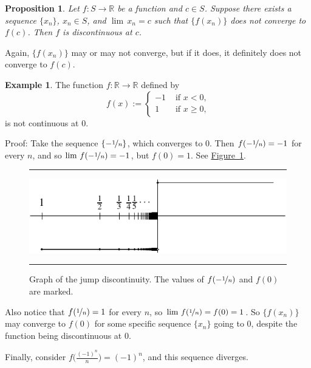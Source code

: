 \documentclass[12pt]{book}
\newenvironment{myfigureht}{%
\begin{figure}[h!t]
\noindent\rule{\textwidth}{0.4pt}\vspace{12pt}\par\centering}%
{\par\noindent\rule{\textwidth}{0.4pt}
\end{figure}}
\newcommand{\R}{{\mathbb{R}}}
\theoremstyle{plain}
\newtheorem{prop}[thm]{Proposition}
\theoremstyle{remark}
\theoremstyle{definition}
\theoremstyle{exercise}
\theoremstyle{example}
\newtheorem{example}[thm]{Example}
\newcommand{\figureref}[1]{\hyperref[#1]{Figure~\ref*{#1}}}
\begin{document}
\begin{prop}
Let $f \colon S \to \R$ be a function and $c \in S$.  Suppose 
there exists a sequence $\{ x_n \}$, $x_n \in S$, and $\lim\, x_n = c$
such that $\{ f(x_n) \}$ does not converge to $f(c)$.  Then $f$ is 
discontinuous at $c$.
\end{prop}

Again, 
$\{ f(x_n) \}$ may or may not converge, but
if it does, it definitely does not converge to
$f(c)$.

\begin{example} \label{example:jumpdiscont}
The function $f \colon \R \to \R$ defined by
\begin{equation*}
f(x) := 
\begin{cases}
-1 & \text{ if $x < 0$,} \\
1 & \text{ if $x \geq 0$,}
\end{cases}
\end{equation*}
is not continuous at 0.

Proof: Take the sequence $\{ - \nicefrac{1}{n} \}$, which converges to 0.  Then
$f(-\nicefrac{1}{n}) = -1$ for every $n$,
and so
$\lim\, f(-\nicefrac{1}{n}) = -1$, but $f(0) = 1$.  See
\figureref{fig:jumpdiscont}.

\begin{myfigureht}
\includegraphics{figures/jumpdiscont}
\caption{Graph of the jump discontinuity.  The values of
$f(-\nicefrac{1}{n})$ and $f(0)$ are marked.\label{fig:jumpdiscont}}
\end{myfigureht}

Also notice that $f(\nicefrac{1}{n}) = 1$ for every $n$,
so $\lim \, f(\nicefrac{1}{n}) = f(0) = 1$.  So
$\{ f(x_n) \}$ may converge to $f(0)$
for some specific
sequence $\{ x_n \}$ going to 0,
despite the function being discontinuous at 0.

Finally, consider $f\bigl(\frac{{(-1)}^n}{n}\bigr) = {(-1)}^n$,
and this sequence diverges.
\end{example}
\end{document}
